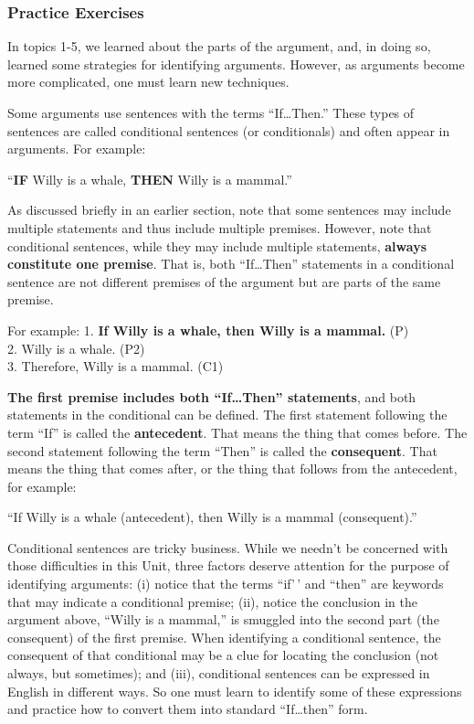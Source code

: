\documentclass[
]{book}
\begin{document}
\hypertarget{practice-exercises-1}{%
\subsubsection*{Practice Exercises}\label{practice-exercises-1}}

In topics 1-5, we learned about the parts of the argument, and, in doing so, learned some strategies for identifying arguments. However, as arguments become more complicated, one must learn new techniques.

Some arguments use sentences with the terms ``If\ldots Then.'' These types of sentences are called conditional sentences (or conditionals) and often appear in arguments. For example:

``\textbf{IF} Willy is a whale, \textbf{THEN} Willy is a mammal.''

As discussed briefly in an earlier section, note that some sentences may include multiple statements and thus include multiple premises. However, note that conditional sentences, while they may include multiple statements, \textbf{always constitute one premise}. That is, both ``If\ldots Then'' statements in a conditional sentence are not different premises of the argument but are parts of the same premise.

For example:
1. \textbf{If Willy is a whale, then Willy is a mammal.} (P)\\
2. Willy is a whale. (P2)\\
3. Therefore, Willy is a mammal. (C1)

\textbf{The first premise includes both ``If\ldots Then'' statements}, and both statements in the conditional can be defined. The first statement following the term ``If'' is called the \textbf{antecedent}. That means the thing that comes before. The second statement following the term ``Then'' is called the \textbf{consequent}. That means the thing that comes after, or the thing that follows from the antecedent, for example:

``If Willy is a whale (antecedent), then Willy is a mammal (consequent).''

Conditional sentences are tricky business. While we needn't be concerned with those difficulties in this Unit, three factors deserve attention for the purpose of identifying arguments: (i) notice that the terms ``if'\,' and ``then'' are keywords that may indicate a conditional premise; (ii), notice the conclusion in the argument above, ``Willy is a mammal,'' is smuggled into the second part (the consequent) of the first premise. When identifying a conditional sentence, the consequent of that conditional may be a clue for locating the conclusion (not always, but sometimes); and (iii), conditional sentences can be expressed in English in different ways. So one must learn to identify some of these expressions and practice how to convert them into standard ``If\ldots then'' form.
\end{document}
